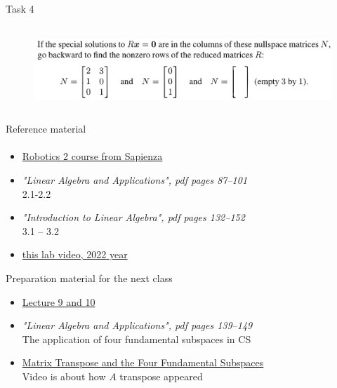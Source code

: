 \documentclass[aspectratio=169]{beamer}
\newcommand{\fbckg}[1]{\usebackgroundtemplate{\texttt{[image: \#1]}}}%
\begin{document}
\begin{frame}[t]{Task 4}
    \framesubtitle{}
    \begin{figure}[H]
        \centering\includegraphics[height=3cm,width=1\textwidth,keepaspectratio]{4.png}
        \label{fig:4.png}
    \end{figure}
\end{frame}

\begin{frame}[t]{Reference material}
    \framesubtitle{}
    \Large
    \begin{itemize}
        \item \href{http://diag.uniroma1.it/~deluca/rob2_en.php}{Robotics 2 course from Sapienza}
        \item \textit{"Linear Algebra and Applications", pdf pages 87--101 } \\ 2.1-2.2
        \item \textit{"Introduction to Linear Algebra", pdf pages 132--152 }\\  3.1 -- 3.2
        \item \href{https://youtu.be/95KM1JWs_Bg}{this lab video, 2022 year}
    \end{itemize}
\end{frame}

\begin{frame}[t]{Preparation material for the next class}
    \Large
    \begin{itemize}
        \item \href{https://www.youtube.com/watch?v=yjBerM5jWsc&list=PL49CF3715CB9EF31D&index=9}{Lecture 9 and 10}
        \item \textit{"Linear Algebra and Applications", pdf pages 139--149 }\\ The application of four fundamental subspaces in CS
        \item \href{https://youtu.be/yfj8uMwAgrI}{Matrix Transpose and the Four Fundamental Subspaces}\\ Video is about how $A$ transpose appeared
    \end{itemize}
\end{frame}

\fbckg{fibeamer/figs/last_page.png}
\frame[plain]{}
\end{document}
